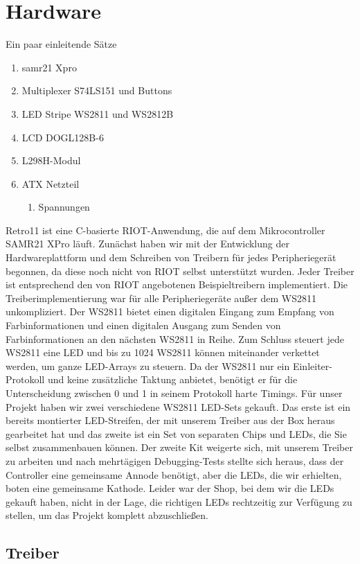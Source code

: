 \documentclass[a4paper]{article}
\begin{document}
\section{Hardware}
\label{sec:hw}
Ein paar einleitende Sätze
\begin{enumerate}
	\item samr21 Xpro
	\item Multiplexer S74LS151 und Buttons
    \item LED Stripe WS2811 und WS2812B
    \item LCD DOGL128B-6
    \item L298H-Modul
	\item ATX Netzteil
	\begin{enumerate}
		\item Spannungen
	\end{enumerate}
\end{enumerate}
Retro11 ist eine C-basierte RIOT-Anwendung, die auf dem Mikrocontroller SAMR21 XPro läuft. Zunächst haben wir mit der Entwicklung der Hardwareplattform und dem Schreiben von Treibern für jedes Peripheriegerät begonnen, da diese noch nicht von RIOT selbst unterstützt wurden. Jeder Treiber ist entsprechend den von RIOT angebotenen Beispieltreibern implementiert. Die Treiberimplementierung war für alle Peripheriegeräte außer dem WS2811 unkompliziert. Der WS2811 bietet einen digitalen Eingang zum Empfang von Farbinformationen und einen digitalen Ausgang zum Senden von Farbinformationen an den nächsten WS2811 in Reihe. Zum Schluss steuert jede WS2811 eine LED und bis zu 1024 WS2811 können miteinander verkettet werden, um ganze LED-Arrays zu steuern. Da der WS2811 nur ein Einleiter-Protokoll und keine zusätzliche Taktung anbietet, benötigt er für die Unterscheidung zwischen 0 und 1 in seinem Protokoll harte Timings. Für unser Projekt haben wir zwei verschiedene WS2811 LED-Sets gekauft. Das erste ist ein bereits montierter LED-Streifen, der mit unserem Treiber aus der Box heraus gearbeitet hat und das zweite ist ein Set von separaten Chips und LEDs, die Sie selbst zusammenbauen können. Der zweite Kit weigerte sich, mit unserem Treiber zu arbeiten und nach mehrtägigen Debugging-Tests stellte sich heraus, dass der Controller eine gemeinsame Annode benötigt, aber die LEDs, die wir erhielten, boten eine gemeinsame Kathode. Leider war der Shop, bei dem wir die LEDs gekauft haben, nicht in der Lage, die richtigen LEDs rechtzeitig zur Verfügung zu stellen, um das Projekt komplett abzuschließen.

\subsection{Treiber}
\label{sec:driver}
\end{document}
